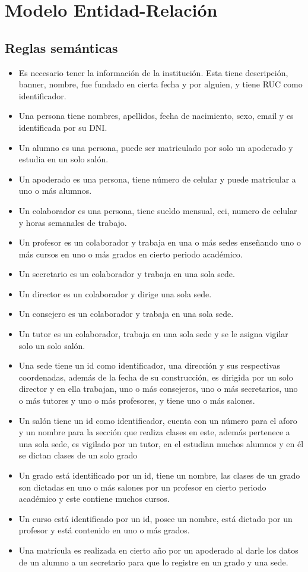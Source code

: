\section{Modelo Entidad-Relación}
\subsection{Reglas semánticas}
\begin{itemize}
	\item Es necesario tener la información de la institución. Esta tiene descripción, banner, nombre, fue fundado en cierta fecha y por alguien, y tiene RUC como identificador.
	\item Una persona tiene nombres, apellidos, fecha de nacimiento, sexo, email y es identificada por su DNI.
	\item Un alumno es una persona, puede ser matriculado por solo un apoderado y estudia en un solo salón.
	\item Un apoderado es una persona, tiene número de celular y puede matricular a uno o más alumnos.
	\item Un colaborador es una persona, tiene sueldo mensual, cci, numero de celular y horas semanales de trabajo.
	\item Un profesor es un colaborador y trabaja en una o más sedes enseñando uno o más cursos en uno o más grados en cierto periodo académico.
	\item Un secretario es un colaborador y trabaja en una sola sede.
	\item Un director es un colaborador y dirige una sola sede.
	\item Un consejero es un colaborador y trabaja en una sola sede.
	\item Un tutor es un colaborador, trabaja en una sola sede y se le asigna vigilar solo un solo salón.
	\item Una sede tiene un id como identificador, una dirección y sus respectivas coordenadas, además de la fecha de su construcción, es dirigida por un solo director y en ella trabajan, uno o más consejeros, uno o más secretarios, uno o más tutores y uno o más profesores, y tiene uno o más salones.
	\item Un salón tiene un id como identificador, cuenta con un número para el aforo y un nombre para la sección que realiza clases en este, además pertenece a una sola sede, es vigilado por un tutor, en el estudian muchos alumnos y en él se dictan clases de un solo grado
	\item Un grado está identificado por un id, tiene un nombre, las clases de un grado son dictadas en uno o más salones por un profesor en cierto periodo académico y este contiene muchos cursos.
	\item Un curso está identificado por un id, posee un nombre, está dictado por un profesor y está contenido en uno o más grados.
	\item  Una matrícula es realizada en cierto año por un apoderado al darle los datos de un alumno a un secretario para que lo registre en un grado y una sede.
\end{itemize}

